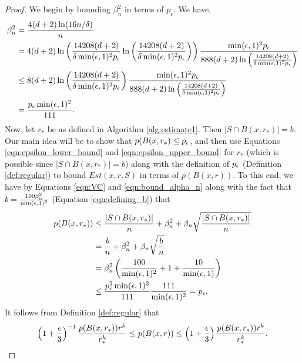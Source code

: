 \begin{proof}
We begin by bounding $\beta_n^2$ in terms of $p_\epsilon$. We have, 
\begin{equation}\label{eqn:bound_alpha_n}
\begin{split}
\beta_n^2 &= \frac{4(d+2)\ln(16n/\delta)}{n} \\
&= 4(d+2) \ln \left(\frac{14208(d+2)}{\delta \min(\epsilon,1)^2 p_\epsilon}\ln\left(\frac{14208(d+2)}{\delta \min(\epsilon,1)^2 p_\epsilon} \right)\right) \frac{\min(\epsilon,1)^2 p_\epsilon}{888(d+2)\ln \left(\frac{14208(d+2)}{\delta \min(\epsilon,1)^2 p_\epsilon} \right)} \\
&\leq 8(d+2)\ln \left(\frac{14208(d+2)}{\delta \min(\epsilon,1)^2 p_\epsilon}\right) \frac{\min(\epsilon, 1)^2 p_\epsilon}{888(d+2)\ln \left(\frac{14208(d+2)}{\delta \min(\epsilon,1)^2 p_\epsilon} \right)} \\
&= \frac{p_\epsilon \min(\epsilon, 1)^2}{111}.
\end{split}
\end{equation}
Now, let $r_*$ be as defined in Algorithm \ref{alg:estimate1}. Then $|S \cap B(x, r_*)| = b$. Our main idea will be to show that $p(B(x, r_*) \leq p_\epsilon$, and then use Equations \ref{eqn:epsilon_lower_bound} and \ref{eqn:epsilon_upper_bound} for $r_*$ (which is possible since $|S \cap B(x, r_*)| = b$) along with the definition of $p_\epsilon$ (Definition \ref{def:regular}) to bound $Est(x, r, S)$ in terms of $p(B(x, r))$. To this end, we have by Equations \ref{eqn:VC} and \ref{eqn:bound_alpha_n} along with the fact that $b = \frac{100\beta_n^2}{\min(\epsilon, 1)^2}$ (Equation \ref{eqn:defining_b}) that 
\begin{equation*}
\begin{split}
p(B(x, r_*)) &\leq \frac{|S \cap B(x, r_*)|}{n} + \beta_n^2 + \beta_n \sqrt{\frac{|S \cap B(x, r_*)|}{n}} \\
&= \frac{b}{n} + \beta_n^2 + \beta_n\sqrt{\frac{b}{n}} \\
&= \beta_n^2\left(\frac{100}{\min(\epsilon,1)^2} +1 + \frac{10}{\min(\epsilon,1)}\right) \\
&\leq \frac{p_\epsilon^2 \min(\epsilon, 1)^2}{111}\frac{111}{\min(\epsilon, 1)^2}  = p_\epsilon.
\end{split}
\end{equation*}
It follows from Definition \ref{def:regular} that 
\begin{equation}\label{eqn:using_regular}
\left(1 + \frac{\epsilon}{3}\right)^{-1}\frac{p(B(x, r_*))r^k}{r_*^k} \leq p(B(x, r)) \leq \left(1 + \frac{\epsilon}{3}\right)\frac{p(B(x, r_*))r^k}{r_*^k}.\end{equation} 

\end{proof}
